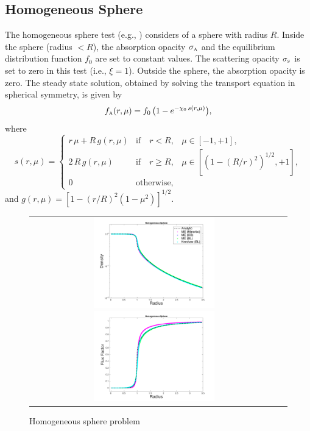 \subsection{Homogeneous Sphere}

The homogeneous sphere test (e.g., \cite{smit_etal_1997}) considers of a sphere with radius $R$.  
Inside the sphere (radius $<R$), the absorption opacity $\sigma_{\mbox{\tiny A}}$ and the equilibrium distribution function $f_{0}$ are set to constant values.  
The scattering opacity $\sigma_{\mbox{\tiny S}}$ is set to zero in this test (i.e., $\xi=1$).  
Outside the sphere, the absorption opacity is zero.  
The steady state solution, obtained by solving the transport equation in spherical symmetry, is given by
\begin{equation}
  f_{\mbox{\tiny A}}(r,\mu)=f_{0}\,\big(1-e^{-\chi_{0}\,s(r,\mu)}\big),
  \label{eq:distributionHomogeneousSphere}
\end{equation}
where
\begin{equation}
  s(r,\mu)
  =\left\{
  \begin{array}{lll}
    r\,\mu+R\,g(r,\mu) & \mbox{if}\quad r<R, & \mu\in[-1,+1], \\
    2\,R\,g(r,\mu) & \mbox{if}\quad r \ge R, & \mu\in[(1-(R/r)^{2})^{1/2},+1], \\
    0 & \mbox{otherwise},
  \end{array}
  \right.
\end{equation}
and $g(r,\mu)=[1-(r/R)^{2}(1-\mu^{2})]^{1/2}$.  

\begin{figure}[h]
  \centering
  \begin{tabular}{cc}
    \includegraphics[width=0.5\textwidth]{figures/HomogeneousSphere_ClosureComparison_Density}
    \includegraphics[width=0.5\textwidth]{figures/HomogeneousSphere_ClosureComparison_FluxFactor}
  \end{tabular}
   \caption{Homogeneous sphere problem}
  \label{fig:HomogeneousSphere}
\end{figure}